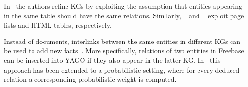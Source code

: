 In~\cite{ref20} the authors refine KGs by exploiting the assumption that entities appearing in the same table should have the same relations. Similarly, ~\cite{ref21} and ~\cite{ref22} exploit page lists and HTML tables, respectively.

Instead of documents, interlinks between the same entities in different KGs can be used to add new facts~\cite{ref23, ref24}. More specifically, relations of two entities in Freebase can be inserted into YAGO if they also appear in the latter KG. In~\cite{ref25} this approach has been extended to a probabilistic setting, where for every deduced relation a corresponding probabilistic weight is computed.